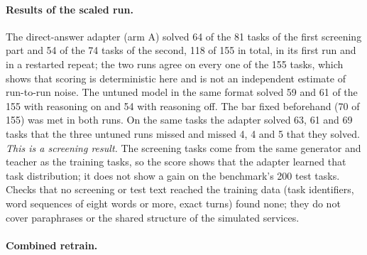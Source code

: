 \paragraph{Results of the scaled run.} The direct-answer adapter (arm A) solved 64 of the 81 tasks of the first screening part and 54 of the 74 tasks of the second, 118 of 155 in total, in its first run and in a restarted repeat; the two runs agree on every one of the 155 tasks, which shows that scoring is deterministic here and is not an independent estimate of run-to-run noise. The untuned model in the same format solved 59 and 61 of the 155 with reasoning on and 54 with reasoning off. The bar fixed beforehand (70 of 155) was met in both runs. On the same tasks the adapter solved 63, 61 and 69 tasks that the three untuned runs missed and missed 4, 4 and 5 that they solved. \emph{This is a screening result.} The screening tasks come from the same generator and teacher as the training tasks, so the score shows that the adapter learned that task distribution; it does not show a gain on the benchmark's 200 test tasks. Checks that no screening or test text reached the training data (task identifiers, word sequences of eight words or more, exact turns) found none; they do not cover paraphrases or the shared structure of the simulated services. %
\paragraph{Combined retrain.} %
